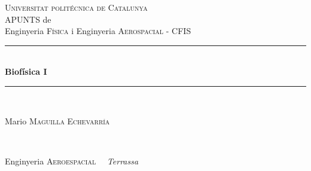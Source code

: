 \documentclass[11pt]{article}
\begin{document}
\begin{titlepage}

\newcommand{\HRule}{\rule{\linewidth}{0.5mm}} %

\center %
 

\textsc{\LARGE Universitat politécnica de Catalunya}\\[1.5cm] %
APUNTS de\\[0.3cm]
Enginyeria \textsc{\Large Física} i Enginyeria \textsc{\Large Aerospacial - CFIS}\\[0.5cm] %


\HRule \\[0.4cm]
{ \huge \bfseries
Biofísica I
}\\[0.4cm] %
\HRule \\[1.5cm]
 

\begin{minipage}{0.4\textwidth}
\begin{flushleft} \large

Mario \textsc{Maguilla Echevarría}  \\
\end{flushleft}
\end{minipage}
~
\begin{minipage}{0.4\textwidth}
\begin{flushright} \large
Enginyeria \textsc{Aeroespacial} \ \ \textit{Terrassa}
\end{flushright}
\end{minipage}\\[2cm]


\end{titlepage}
\end{document}
